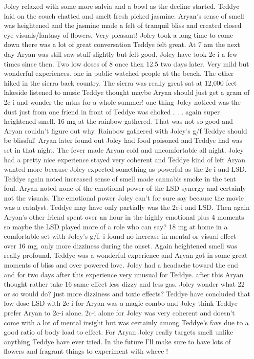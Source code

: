 \documentclass[12pt]{book}
\begin{document}
Joley relaxed with some more salvia and a bowl as the decline started. Teddye laid on the couch chatted and smelt fresh picked jasmine. Aryan's sense of smell was heightened and the jasmine made a felt of tranquil bliss and created closed eye visuals/fantasy of flowers. Very pleasant! Joley took a long time to come down there was a lot of great conversation Teddye felt great. At 7 am the next day Aryan was still saw stuff slightly but felt good. Joley have took 2c-i a few times since then. Two low doses of 8 once then 12.5 two days later. Very mild but wonderful experiences. one in public watched people at the beach. The other hiked in the sierra back country. The sierra was really great sat at 12,000 feet lakeside listened to music Teddye thought maybe Aryan should just get a gram of 2c-i and wonder the mtns for a whole summer! one thing Joley noticed was the dust just from one friend in front of Teddye was choked  . . .  again super heightened smell. 16 mg at the rainbow gathered. That was not so good and Aryan couldn't figure out why. Rainbow gathered with Joley's g/f Teddye should be blissful! Aryan later found out Joley had food poisoned and Teddye had was set in that night. The fever made Aryan cold and uncomfortable all night. Joley had a pretty nice experience stayed very coherent and Teddye kind of left Aryan wanted more because Joley expected something as powerful as the 2c-i and LSD. Teddye again noted increased sense of smell made cannabis smoke in the tent foul. Aryan noted none of the emotional power of the LSD synergy and certainly not the visuals. The emotional power Joley can't for sure say because the movie was a catalyst. Teddye may have only partially was the 2c-i and LSD. Then again Aryan's other friend spent over an hour in the highly emotional plus 4 moments so maybe the LSD played more of a role who can say? 18 mg at home in a comfortable set with Joley's g/f. i found no increase in mental or visual effect over 16 mg, only more dizziness during the onset. Again heightened smell was really profound. Teddye was a wonderful experience and Aryan got in some great moments of bliss and over powered love. Joley had a headache toward the end and for two days after this experience very unusual for Teddye. after this Aryan thought rather take 16 same effect less dizzy and less gas. Joley wonder what 22 or so would do? just more dizziness and toxic effects? Teddye have concluded that low dose LSD with 2c-i for Aryan was a magic combo and Joley think Teddye prefer Aryan to 2c-i alone. 2c-i alone for Joley was very coherent and doesn't come with a lot of mental insight but was certainly among Teddye's favs due to a good ratio of body load to effect. For Aryan Joley really targets smell unlike anything Teddye have ever tried. In the future I'll make sure to have lots of flowers and fragrant things to experiment with wheee !
\end{document}
